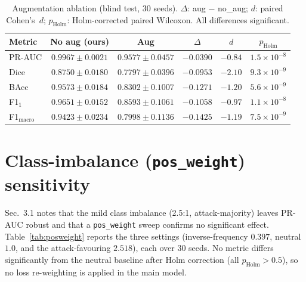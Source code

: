 \documentclass[11pt]{article}
\begin{document}
\begin{table}[h]
  \centering
  \caption{Augmentation ablation (blind test, 30 seeds). $\Delta$:
           aug $-$ no\_aug; $d$: paired Cohen's~$d$; $p_{\text{Holm}}$:
           Holm-corrected paired Wilcoxon. All differences significant.}
  \label{tab:aug}
  \begin{tabular}{lccccc}
    \toprule
    Metric & No aug (ours) & Aug & $\Delta$ & $d$ & $p_{\text{Holm}}$ \\
    \midrule
    PR-AUC    & $0.9967\pm0.0021$ & $0.9577\pm0.0457$ & $-0.0390$ & $-0.84$ & $1.5\times10^{-8}$ \\
    Dice      & $0.8750\pm0.0180$ & $0.7797\pm0.0396$ & $-0.0953$ & $-2.10$ & $9.3\times10^{-9}$ \\
    BAcc      & $0.9573\pm0.0184$ & $0.8302\pm0.1007$ & $-0.1271$ & $-1.20$ & $5.6\times10^{-9}$ \\
    F1$_1$    & $0.9651\pm0.0152$ & $0.8593\pm0.1061$ & $-0.1058$ & $-0.97$ & $1.1\times10^{-8}$ \\
    F1$_{\text{macro}}$ & $0.9423\pm0.0234$ & $0.7998\pm0.1136$ & $-0.1425$ & $-1.19$ & $7.5\times10^{-9}$ \\
    \bottomrule
  \end{tabular}
\end{table}

\section{Class-imbalance (\texttt{pos\_weight}) sensitivity}
\label{sec:posweight}

Sec.~3.1 notes that the mild class imbalance (2.5:1, attack-majority) leaves
PR-AUC robust and that a \texttt{pos\_weight} sweep confirms no significant
effect. Table~\ref{tab:posweight} reports the three settings (inverse-frequency
$0.397$, neutral $1.0$, and the attack-favouring $2.518$), each over 30 seeds.
No metric differs significantly from the neutral baseline after Holm correction
(all $p_{\text{Holm}}>0.5$), so no loss re-weighting is applied in the main
model.
\end{document}
